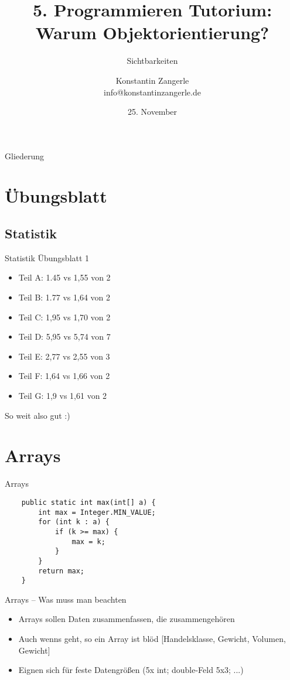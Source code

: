 \documentclass[18pt]{beamer}
\title[Programmieren Tutorium]{5. Programmieren Tutorium:\texorpdfstring{\\}{} Warum Objektorientierung?}
\subtitle{Sichtbarkeiten}
\author{Konstantin Zangerle \texorpdfstring{\\}{} info@konstantinzangerle.de}
\date{25. November}
\institute{Chair for Software Design and Quality}
\begin{document}

\begin{frame}
\titlepage
\end{frame}

\begin{frame}{Gliederung}
\tableofcontents
\end{frame}

\section{Übungsblatt}

\subsection{Statistik}
\begin{frame}{Statistik Übungsblatt 1}
\begin{itemize}
 \item Teil A: 1.45 vs 1,55 von 2 
 \item Teil B: 1.77 vs 1,64 von 2 	
 \item Teil C: 1,95 vs 1,70 von 2 	
 \item Teil D: 5,95 vs 5,74 von 7	
 \item Teil E: 2,77 vs 2,55 von 3
 \item Teil F: 1,64 vs 1,66 von 2
 \item Teil G: 1,9 vs 1,61 von 2
\end{itemize}
So weit also gut :)
\end{frame}


\section{Arrays} %


\begin{frame}[fragile]{Arrays}
 \begin{lstlisting}
    public static int max(int[] a) {
        int max = Integer.MIN_VALUE;
        for (int k : a) {
            if (k >= max) {
                max = k;
            }
        }
        return max;
    }
 \end{lstlisting}
\end{frame}

\begin{frame}{Arrays – Was muss man beachten}
 \begin{itemize}
  \item Arrays sollen Daten zusammenfassen, die zusammengehören
  \item Auch wenns geht, so ein Array ist blöd [Handelsklasse, Gewicht, Volumen, Gewicht]
  \item Eignen sich für feste Datengrößen (5x int; double-Feld 5x3; ...)
 \end{itemize}

\end{frame}
\end{document}
